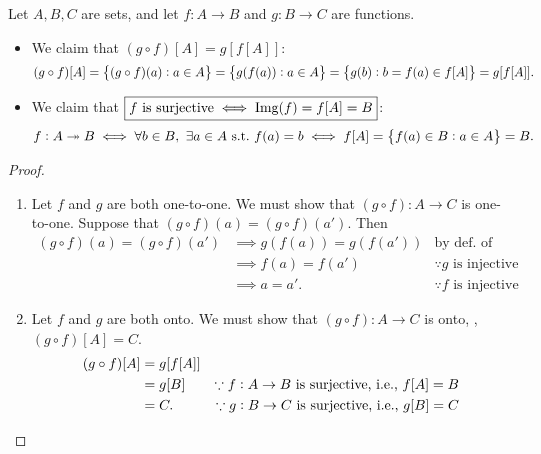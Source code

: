 \documentclass[11pt,openany]{article}
\begin{document}
\newpage
\begin{note}
	Let $A,B,C$ are sets, and let $f:A\to B$ and $g:B\to C$ are functions.
	\begin{itemize}
		\item We claim that $\boxed{(g\circ f)[A]=g[f[A]]}$:\[
		(g\circ f)[A]=\set{(g\circ f)(a):a\in A}=\set{g(f(a)):a\in A}=\set{g(b):b=f(a)\in f[A]}=g[f[A]].
		\]
		\item We claim that $\boxed{f\ \text{is surjective}\iff \text{Img}(f)=f[A]=B}$: \[
			f:A\twoheadrightarrow B\iff \forall b\in B,\ \exists a\in A\ \text{s.t.}\ f(a)=b\iff f[A]=\set{f(a)\in B:a\in A}=B.
			\]
	\end{itemize} 
\end{note}
\begin{proof}
	\begin{enumerate}[(1)]
		\item Let $f$ and $g$ are both one-to-one. We must show that $(g\circ f):A\to C$ is one-to-one. Suppose that $(g\circ f)(a)=(g\circ f)(a')$. Then \begin{align*}
			(g\circ f)(a)=(g\circ f)(a') &\implies g(f(a))=g(f(a')) &\text{by def. of composition} \\&\implies f(a)=f(a') &\because\text{$g$ is injective} \\
			&\implies a=a'. &\because\text{$f$ is injective}
		\end{align*}
		\item Let $f$ and $g$ are both onto. We must show that $(g\circ f):A\to C$ is onto, \ie, $(g\circ f)[A]=C$.
		\begin{align*}
			(g\circ f)[A] &=g[f[A]] \\
			&= g[B] &\because\text{$f:A\to B$ is surjective, \textnormal{i.e.}, $f[A]=B$} \\
			&= C. &\because\text{$g:B\to C$ is surjective, \textnormal{i.e.}, $g[B]=C$} \\
		\end{align*}
	\end{enumerate}
\end{proof}
\end{document}
